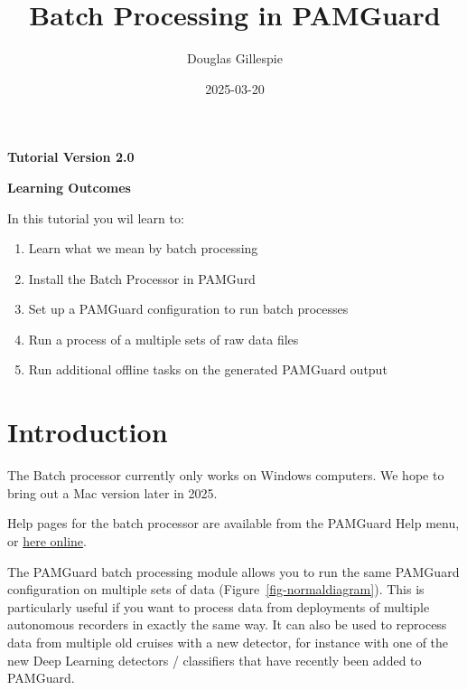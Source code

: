 \documentclass[
]{article}
\title{Batch Processing in PAMGuard}
\author[1]{Douglas Gillespie}
\affil[1]{Sea Mammal Research Unit, University of St Andrews}
\date{2025-03-20}
\renewcommand*\contentsname{Table of contents}
\newcommand\contentsname{Table of contents}
\begin{document}
\maketitle

\centerline{\textbf{Tutorial Version 2.0}}
\vspace{3cm}


\centerline{\textbf{Learning Outcomes}}

In this tutorial you wil learn to:
\begin{enumerate}
\item Learn what we mean by batch processing
\item Install the Batch Processor in PAMGurd
\item Set up a PAMGuard configuration to run batch processes
\item Run a process of a multiple sets of raw data files
\item Run additional offline tasks on the generated PAMGuard output
\end{enumerate}
\newpage

\renewcommand*\contentsname{Table of contents}
{
\hypersetup{linkcolor=}
\setcounter{tocdepth}{3}
\tableofcontents
}
\listoffigures

\newpage{}

\pagestyle{plain}

\section{Introduction}\label{introduction}

The Batch processor currently only works on Windows computers. We hope
to bring out a Mac version later in 2025.

Help pages for the batch processor are available from the PAMGuard Help
menu, or
\href{https://www.pamguard.org/batchhelp/docs/batchoverview.html}{here
online}.

The PAMGuard batch processing module allows you to run the same PAMGuard
configuration on multiple sets of data (Figure~\ref{fig-normaldiagram}).
This is particularly useful if you want to process data from deployments
of multiple autonomous recorders in exactly the same way. It can also be
used to reprocess data from multiple old cruises with a new detector,
for instance with one of the new Deep Learning detectors / classifiers
that have recently been added to PAMGuard.
\end{document}

